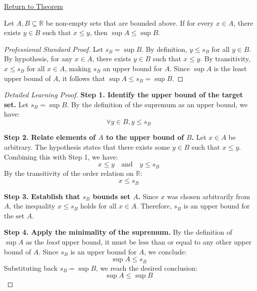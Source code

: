 \newpage
{}
\label{prf:order-comparison-of-suprema}

\begin{remark*}[Return]
\hyperref[prop:order-comparison-of-suprema]{Return to Theorem}
\end{remark*}

\begin{proposition*}
Let $A, B \subseteq \mathbb{R}$ be non-empty sets that are bounded above. If for every $x \in A$, there exists $y \in B$ such that $x \le y$, then $\sup A \le \sup B$.
\end{proposition*}

\begin{proof}[Professional Standard Proof]
\LRAProofBodyStart
Let $s_B = \sup B$. By definition, $y \le s_B$ for all $y \in B$. By hypothesis, for any $x \in A$, there exists $y \in B$ such that $x \le y$. By transitivity, $x \le s_B$ for all $x \in A$, making $s_B$ an upper bound for $A$. Since $\sup A$ is the least upper bound of $A$, it follows that $\sup A \le s_B = \sup B$.
\end{proof}

\begin{proof}[Detailed Learning Proof]
\LRAProofBodyStart

\textbf{Step 1. Identify the upper bound of the target set.}
Let $s_B = \sup B$. By the definition of the supremum as an upper bound, we have:
\[ \forall y \in B, y \le s_B \]

\textbf{Step 2. Relate elements of $A$ to the upper bound of $B$.}
Let $x \in A$ be arbitrary. The hypothesis states that there exists some $y \in B$ such that $x \le y$. Combining this with Step 1, we have:
\[ x \le y \quad \text{and} \quad y \le s_B \]
By the transitivity of the order relation on $\mathbb{R}$:
\[ x \le s_B \]

\textbf{Step 3. Establish that $s_B$ bounds set $A$.}
Since $x$ was chosen arbitrarily from $A$, the inequality $x \le s_B$ holds for all $x \in A$. Therefore, $s_B$ is an upper bound for the set $A$.

\textbf{Step 4. Apply the minimality of the supremum.}
By the definition of $\sup A$ as the \textit{least} upper bound, it must be less than or equal to any other upper bound of $A$. Since $s_B$ is an upper bound for $A$, we conclude:
\[ \sup A \le s_B \]
Substituting back $s_B = \sup B$, we reach the desired conclusion:
\[ \sup A \le \sup B \]
\end{proof}

